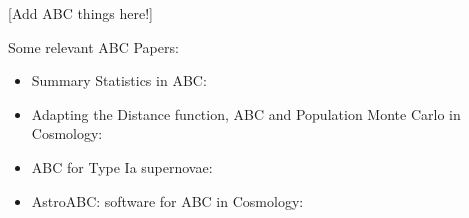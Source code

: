 \documentclass[fleqn,usenatbib]{mnras}
\begin{document}
[Add ABC things here!]

Some relevant ABC Papers:
\begin{itemize}
\item{Summary Statistics in ABC: \citep{prangle2015a}}
\item{Adapting the Distance function, ABC and Population Monte Carlo in Cosmology: \citep{prangle2015b}}
\item{ABC for Type Ia supernovae: \citep{jennings2016}}
\item{AstroABC: software for ABC in Cosmology: \citep{jennings2017}}
\end{itemize}




\end{document}
